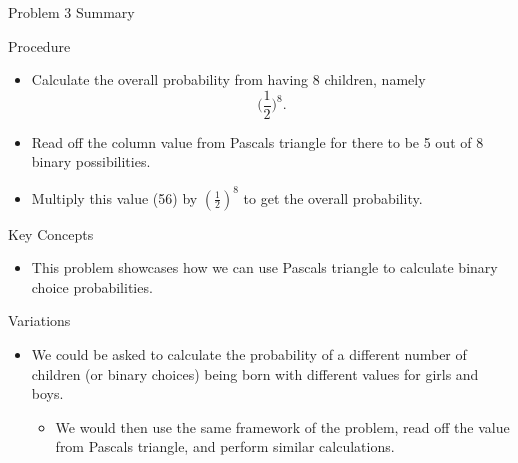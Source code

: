\begin{summary}{Problem 3 Summary}
    \begin{statement}{Procedure}
        \begin{itemize}
            \item Calculate the overall probability from having 8 children, namely
            \begin{equation*}
                \Biggl(\frac{1}{2}\Biggr)^{8}.
            \end{equation*}
            \item Read off the column value from Pascals triangle for there to be 5 out of 8 binary possibilities.
            \item Multiply this value (56) by $(\frac{1}{2})^{8}$ to get the overall probability.
        \end{itemize}
    \end{statement}
    \begin{statement}{Key Concepts}
        \begin{itemize}
            \item This problem showcases how we can use Pascals triangle to calculate binary choice probabilities.
        \end{itemize}
    \end{statement}
    \begin{statement}{Variations}
        \begin{itemize}
            \item We could be asked to calculate the probability of a different number of children (or binary choices) being born with different values for girls and boys.
            \begin{itemize}
                \item We would then use the same framework of the problem, read off the value from Pascals triangle, and perform similar calculations.
            \end{itemize}
        \end{itemize}
    \end{statement}
\end{summary}

